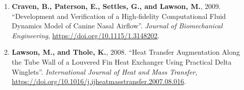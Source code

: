 \begin{enumerate}[leftmargin=1.5pc,itemsep=0pt,parsep=0pt,topsep=0pt,partopsep=1pt]
\item \textbf{Craven, B., Paterson, E., Settles, G., and Lawson, M.}, 2009. ``Development and Verification of a High-fidelity Computational Fluid Dynamics Model of Canine Nasal Airflow''. \emph{Journal of Biomechanical Engineering}, \href{https://doi.org/10.1115/1.3148202}{https://doi.org/10.1115/1.3148202}.

\item \textbf{Lawson, M., and Thole, K.}, 2008. ``Heat Transfer Augmentation Along the Tube Wall of a Louvered Fin Heat Exchanger Using Practical Delta Winglets''. \emph{International Journal of Heat and Mass Transfer}, \href{https://doi.org/10.1016/j.ijheatmasstransfer.2007.08.016}{https://doi.org/10.1016/j.ijheatmasstransfer.2007.08.016}.


\end{enumerate}



